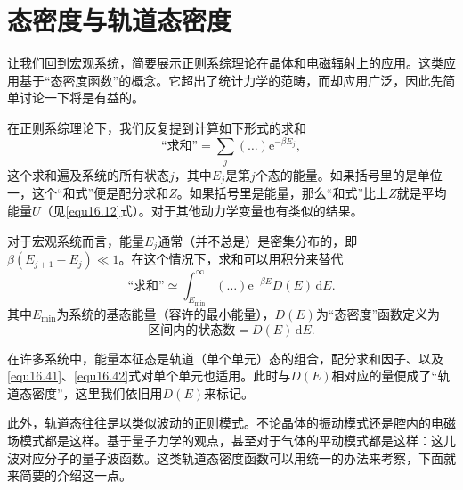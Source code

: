 \section{态密度与轨道态密度}\label{sec16.6}
让我们回到宏观系统，简要展示正则系综理论在晶体和电磁辐射上的应用。这类应用基于“态密度函数”的概念。它超出了统计力学的范畴，而却应用广泛，因此先简单讨论一下将是有益的。

在正则系综理论下，我们反复提到计算如下形式的求和
\begin{equation}
\text{``求和''} = \sum\limits_j(\dots)\mathrm e^{-\beta E_j},
\end{equation}
这个求和遍及系统的所有状态$j$，其中$E_j$是第$j$个态的能量。如果括号里的是单位一，这个``和式''便是配分求和$Z$。如果括号里是能量，那么``和式''比上$Z$就是平均能量$U$（见\eqref{equ16.12}式）。对于其他动力学变量也有类似的结果。

对于宏观系统而言，能量$E_j$通常（并不总是）是密集分布的，即$\beta (E_{j+1}-E_j)\ll 1$。在这个情况下，求和可以用积分来替代
\begin{equation}
\text{``求和''}\simeq \int_{E_{\min}}^\infty (\dots)\mathrm e^{-\beta E}D(E)\,\mathrm dE.
\label{equ16.41}
\end{equation}
其中$E_{\min}$为系统的基态能量（容许的最小能量），$D(E)$为“态密度”函数定义为
\begin{equation}
[E,E+\mathrm dE]\text{区间内的状态数}=D(E)\,\mathrm dE.
\label{equ16.42}
\end{equation}

在许多系统中，能量本征态是轨道（单个单元）态的组合，配分求和因子、以及\eqref{equ16.41}、\eqref{equ16.42}式对单个单元也适用。此时与$D(E)$相对应的量便成了``轨道态密度''，这里我们依旧用$D(E)$来标记。

此外，轨道态往往是以类似波动的正则模式。不论晶体的振动模式还是腔内的电磁场模式都是这样。基于量子力学的观点，甚至对于气体的平动模式都是这样：这儿波对应分子的量子波函数。这类轨道态密度函数可以用统一的办法来考察，下面就来简要的介绍这一点。

